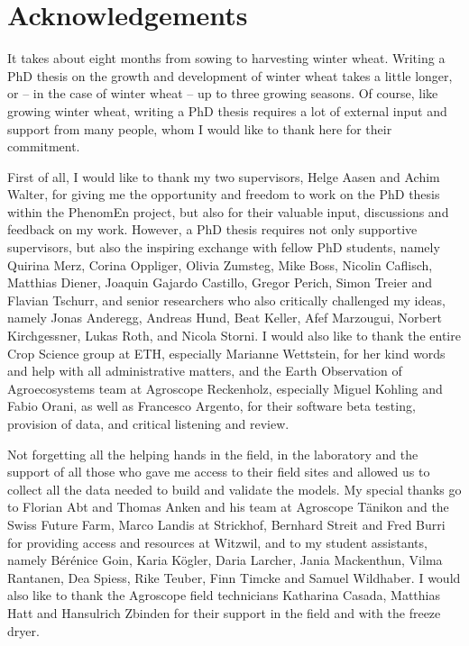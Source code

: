 \chapter*{Acknowledgements}
\renewcommand{\sectionmark}[1]{ \markright{ \MakeUppercase{#1} } }

It takes about eight months from sowing to harvesting winter wheat. Writing a PhD thesis on the growth and development of winter wheat takes a little longer, or -- in the case of winter wheat -- up to three growing seasons. Of course, like growing winter wheat, writing a PhD thesis requires a lot of external input and support from many people, whom I would like to thank here for their commitment.

First of all, I would like to thank my two supervisors, Helge Aasen and Achim Walter, for giving me the opportunity and freedom to work on the PhD thesis within the PhenomEn project, but also for their valuable input, discussions and feedback on my work. However, a PhD thesis requires not only supportive supervisors, but also the inspiring exchange with fellow PhD students, namely Quirina Merz, Corina Oppliger, Olivia Zumsteg, Mike Boss, Nicolin Caflisch, Matthias Diener, Joaquin Gajardo Castillo, Gregor Perich, Simon Treier and Flavian Tschurr, and senior researchers who also critically challenged my ideas, namely Jonas Anderegg, Andreas Hund, Beat Keller, Afef Marzougui, Norbert Kirchgessner, Lukas Roth, and Nicola Storni. I would also like to thank the entire Crop Science group at ETH, especially Marianne Wettstein, for her kind words and help with all administrative matters, and the Earth Observation of Agroecosystems team at Agroscope Reckenholz, especially Miguel Kohling and Fabio Orani, as well as Francesco Argento, for their software beta testing, provision of data, and critical listening and review.

Not forgetting all the helping hands in the field, in the laboratory and the support of all those who gave me access to their field sites and allowed us to collect all the data needed to build and validate the models. My special thanks go to Florian Abt and Thomas Anken and his team at Agroscope Tänikon and the Swiss Future Farm, Marco Landis at Strickhof, Bernhard Streit and Fred Burri for providing access and resources at Witzwil, and to my student assistants, namely Bérénice Goin, Karia Kögler, Daria Larcher, Jania Mackenthun, Vilma Rantanen, Dea Spiess, Rike Teuber, Finn Timcke and Samuel Wildhaber. I would also like to thank the Agroscope field technicians Katharina Casada, Matthias Hatt and Hansulrich Zbinden for their support in the field and with the freeze dryer.

